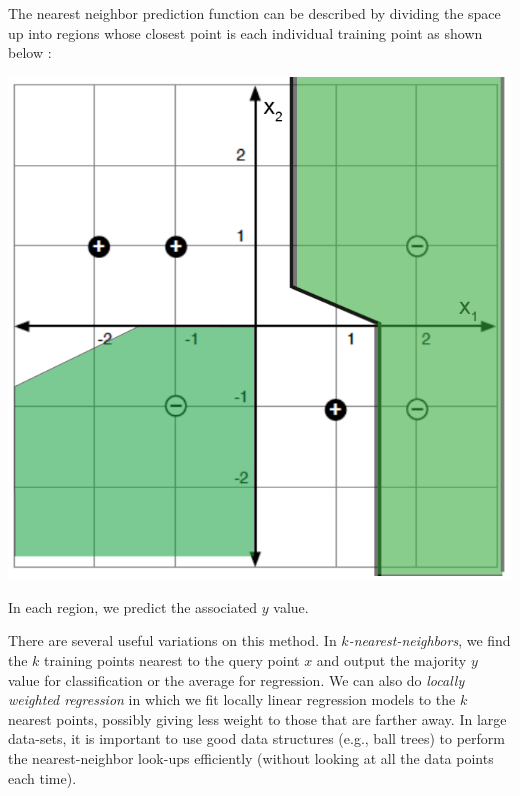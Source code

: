 The nearest neighbor prediction function can be described by dividing
the space up into regions whose closest point is each individual training
point as shown below :
\begin{center}
  \includegraphics[scale=0.75]{figures/voronoi.png}
\end{center}
In each region, we predict the associated $y$ value.

There are several useful variations on this method.  In {\em
    $k$-nearest-neighbors}, we find the $k$  training points nearest to
the query point $x$ and output the majority $y$ value for
classification or the average for regression.  We can also do {\em
    locally weighted regression} in which we fit locally linear
regression models to the $k$ nearest points, possibly giving less
weight to those that are farther away.  In large data-sets, it is
important to use good data structures (e.g., ball trees) to perform
the nearest-neighbor look-ups efficiently (without looking at all the
data points each time).

